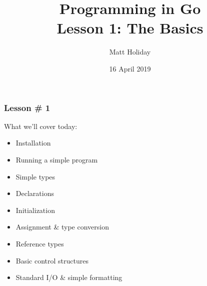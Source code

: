 \documentclass[handout,compress,t,11pt]{beamer}
\title[Programming in Go]{\bf Programming in Go\\ Lesson 1: The Basics}
\author{Matt Holiday}
\institute[CP]{Cardinal Peak}
\date{16 April 2019}
\begin{document}
\frame{\titlepage} 

\begin{frame}[fragile]
    \frametitle{Lesson \# 1}
    What we'll cover today:
    \begin{itemize}
    \item Installation
    \item Running a simple program
    \item Simple types
    \item Declarations
    \item Initialization
    \item Assignment \& type conversion
    \item Reference types
    \item Basic control structures
    \item Standard I/O \& simple formatting
    \end{itemize}
\end{frame}
\end{document}
